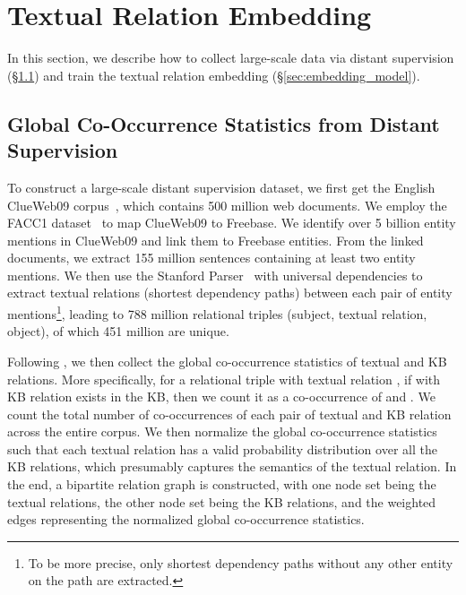 \documentclass[11pt,a4paper]{article}
\begin{document}
%
 \section{Textual Relation Embedding}
\label{sec:model}

In this section, we describe how to collect large-scale data via distant supervision (\S\ref{sec:global_statistics}) and train the textual relation embedding  (\S\ref{sec:embedding_model}).

\subsection{Global Co-Occurrence Statistics from Distant Supervision}
\label{sec:global_statistics}
To construct a large-scale distant supervision dataset, we first get the English ClueWeb09 corpus~\cite{callan2009clueweb09}, which contains 500 million web documents. We employ the FACC1 dataset~\cite{gabrilovich2013facc1} to map ClueWeb09 to Freebase. We identify over 5 billion entity mentions in ClueWeb09 and link them to Freebase entities. From the linked documents, we extract 155 million sentences containing at least two entity mentions. We then use the Stanford
Parser~\cite{chen2014fast} with universal dependencies to extract textual relations (shortest dependency paths) between each pair of entity mentions\footnote{To be more precise, only shortest dependency paths without any other entity on the path are extracted.}, leading to 788 million relational triples (subject, textual relation, object), of which 451 million are unique.

Following \cite{su2017global}, we then collect the global co-occurrence statistics of textual and KB relations. More specifically, for a relational triple  with textual relation , if  with KB relation  exists in the KB, then we count it as a co-occurrence of  and . We count the total number of co-occurrences of each pair of textual and KB relation across the entire corpus. We then normalize the global co-occurrence statistics such that each textual relation has a valid probability distribution over all the KB relations, which presumably captures the semantics of the textual relation. In the end, a bipartite relation graph is constructed, with one node set being the textual relations, the other node set being the KB relations, and the weighted edges representing the normalized global co-occurrence statistics. 
\end{document}
